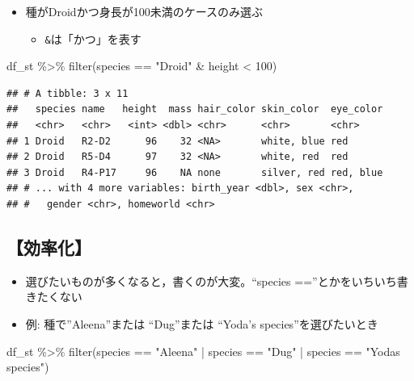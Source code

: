 \documentclass[
  xelatex,ja=standard, b5paper]{bxjsbook}
\newenvironment{Shaded}{\begin{snugshade}}{\end{snugshade}}
\newcommand{\DecValTok}[1]{\textcolor[rgb]{0.00,0.00,0.81}{#1}}
\newcommand{\FunctionTok}[1]{\textcolor[rgb]{0.00,0.00,0.00}{#1}}
\newcommand{\NormalTok}[1]{#1}
\newcommand{\SpecialCharTok}[1]{\textcolor[rgb]{0.00,0.00,0.00}{#1}}
\newcommand{\StringTok}[1]{\textcolor[rgb]{0.31,0.60,0.02}{#1}}
\providecommand{\tightlist}{%
  \setlength{\itemsep}{0pt}\setlength{\parskip}{0pt}}
\begin{document}
\begin{itemize}
\tightlist
\item
  種がDroidかつ身長が100未満のケースのみ選ぶ

  \begin{itemize}
  \tightlist
  \item
    \texttt{\&}は「かつ」を表す
  \end{itemize}
\end{itemize}

\begin{Shaded}
\begin{Highlighting}[]
\NormalTok{df\_st }\SpecialCharTok{\%\textgreater{}\%} 
  \FunctionTok{filter}\NormalTok{(species }\SpecialCharTok{==} \StringTok{"Droid"} \SpecialCharTok{\&}\NormalTok{ height }\SpecialCharTok{\textless{}} \DecValTok{100}\NormalTok{)}
\end{Highlighting}
\end{Shaded}

\begin{verbatim}
## # A tibble: 3 x 11
##   species name   height  mass hair_color skin_color  eye_color
##   <chr>   <chr>   <int> <dbl> <chr>      <chr>       <chr>    
## 1 Droid   R2-D2      96    32 <NA>       white, blue red      
## 2 Droid   R5-D4      97    32 <NA>       white, red  red      
## 3 Droid   R4-P17     96    NA none       silver, red red, blue
## # ... with 4 more variables: birth_year <dbl>, sex <chr>,
## #   gender <chr>, homeworld <chr>
\end{verbatim}

\hypertarget{filter-multi-eff}{%
\subsection{【効率化】}\label{filter-multi-eff}}

\begin{itemize}
\tightlist
\item
  選びたいものが多くなると，書くのが大変。``species ==''とかをいちいち書きたくない
\item
  例: 種で''Aleena''または ``Dug''または ``Yoda's species''を選びたいとき
\end{itemize}

\begin{Shaded}
\begin{Highlighting}[]
\NormalTok{df\_st }\SpecialCharTok{\%\textgreater{}\%} 
  \FunctionTok{filter}\NormalTok{(species }\SpecialCharTok{==} \StringTok{"Aleena"} \SpecialCharTok{|}\NormalTok{ species }\SpecialCharTok{==} \StringTok{"Dug"} \SpecialCharTok{|}\NormalTok{ species }\SpecialCharTok{==} \StringTok{"Yoda\textquotesingle{}s species"}\NormalTok{)}
\end{Highlighting}
\end{Shaded}
\end{document}
